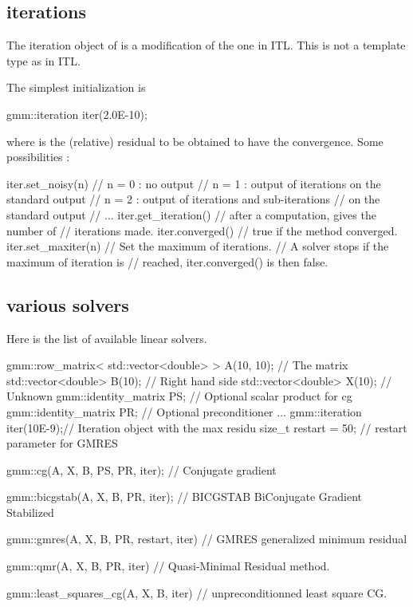 \documentclass[11pt,a4paper]{article}
\begin{document}
\subsection{iterations}
  The iteration object of \gmm is a modification of the one in ITL. This is not a template type as in ITL. 

The simplest initialization is
\begin{cppcode}
  gmm::iteration iter(2.0E-10);
\end{cppcode}
where  is the (relative) residual to be obtained to have the convergence.
Some possibilities :
\begin{cppcode}
  iter.set_noisy(n) // n = 0 : no output
                    // n = 1 : output of iterations on the standard output
                    // n = 2 : output of iterations and sub-iterations 
                    //         on the standard output
                    // ...
  iter.get_iteration() // after a computation, gives the number of
                       // iterations made.
  iter.converged()     // true if the method converged.
  iter.set_maxiter(n)  // Set the maximum of iterations.
                       // A solver stops if the maximum of iteration is 
                       // reached, iter.converged() is then false.
\end{cppcode}

\subsection{various solvers}
Here is the list of available linear solvers.
\begin{cppcode}
  gmm::row_matrix< std::vector<double> > A(10, 10);  // The matrix
  std::vector<double> B(10); // Right hand side
  std::vector<double> X(10); // Unknown
  gmm::identity_matrix PS;   // Optional scalar product for cg
  gmm::identity_matrix PR;   // Optional preconditioner
  ...
  gmm::iteration iter(10E-9);// Iteration object with the max residu
  size_t restart = 50;       // restart parameter for GMRES
  
  gmm::cg(A, X, B, PS, PR, iter); // Conjugate gradient

  gmm::bicgstab(A, X, B, PR, iter); // BICGSTAB BiConjugate Gradient Stabilized

  gmm::gmres(A, X, B, PR, restart, iter) // GMRES generalized minimum residual

  gmm::qmr(A, X, B, PR, iter) // Quasi-Minimal Residual method.

  gmm::least_squares_cg(A, X, B, iter) // unpreconditionned least square CG.
\end{cppcode}
\end{document}
